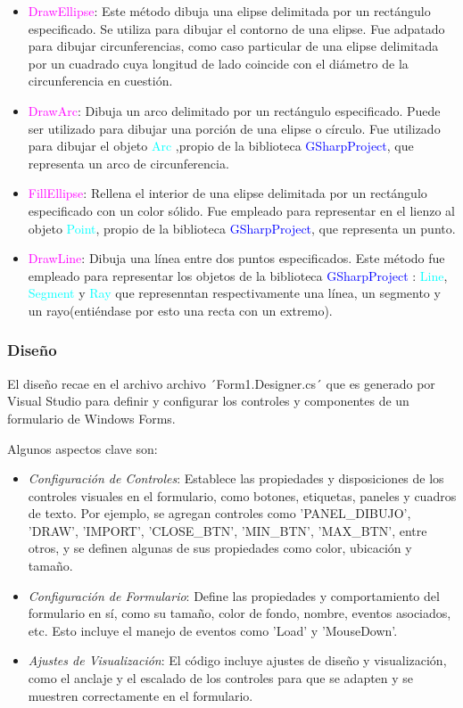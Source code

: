 \documentclass[a4paper, 12pt]{article}
\begin{document}
\begin{itemize}
\item \textcolor{magenta}{DrawEllipse}: Este método dibuja una elipse delimitada por un rectángulo especificado. Se utiliza para dibujar el contorno de una elipse. Fue adpatado para dibujar circunferencias, como caso particular de una elipse delimitada por un cuadrado cuya longitud de lado coincide con el diámetro de la circunferencia en cuestión.

\item \textcolor{magenta}{ DrawArc}: Dibuja un arco delimitado por un rectángulo especificado. Puede ser utilizado para dibujar una porción de una elipse o círculo. Fue utilizado para dibujar el objeto \textcolor{cyan}{Arc} ,propio de la biblioteca \textcolor{blue}{GSharpProject}, que representa un arco de circunferencia.

\item \textcolor{magenta}{ FillEllipse}: Rellena el interior de una elipse delimitada por un rectángulo especificado con un color sólido. Fue empleado para representar en el lienzo al objeto  \textcolor{cyan}{Point}, propio de la biblioteca \textcolor{blue}{GSharpProject}, que representa un punto.

\item \textcolor{magenta}{ DrawLine}: Dibuja una línea entre dos puntos especificados. Este método fue empleado para representar los objetos de la biblioteca \textcolor{blue}{GSharpProject} : \textcolor{cyan}{Line}, \textcolor{cyan}{Segment} y \textcolor{cyan}{Ray} que represenntan respectivamente una línea, un segmento y un rayo(entiéndase por esto una recta con un extremo).
\end{itemize}
\subsubsection{Diseño}\label{}
El diseño recae en el archivo archivo ´Form1.Designer.cs´ que es generado por Visual Studio para definir y configurar los controles y componentes de un formulario de Windows Forms. 

Algunos aspectos clave son:
\begin{itemize}
\item \textit{Configuración de Controles}: Establece las propiedades y disposiciones de los controles visuales en el formulario, como botones, etiquetas, paneles y cuadros de texto. Por ejemplo, se agregan controles como 'PANEL\_DIBUJO', 'DRAW', 'IMPORT', 'CLOSE\_BTN', 'MIN\_BTN', 'MAX\_BTN', entre otros, y se definen algunas de sus propiedades como color, ubicación y tamaño.

\item \textit{Configuración de Formulario}: Define las propiedades y comportamiento del formulario en sí, como su tamaño, color de fondo, nombre, eventos asociados, etc. Esto incluye el manejo de eventos como 'Load' y 'MouseDown'.

\item \textit{Ajustes de Visualización}: El código incluye ajustes de diseño y visualización, como el anclaje y el escalado de los controles para que se adapten y se muestren correctamente en el formulario.
\end{itemize}
\end{document}
